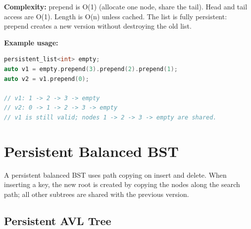 \textbf{Complexity:} prepend is O(1) (allocate one node, share the tail). Head and tail access are O(1). Length is O(n) unless cached. The list is fully persistent: prepend creates a new version without destroying the old list.

\textbf{Example usage:}
\begin{lstlisting}[language=C++]
persistent_list<int> empty;
auto v1 = empty.prepend(3).prepend(2).prepend(1);
auto v2 = v1.prepend(0);

// v1: 1 -> 2 -> 3 -> empty
// v2: 0 -> 1 -> 2 -> 3 -> empty
// v1 is still valid; nodes 1 -> 2 -> 3 -> empty are shared.
\end{lstlisting}

\section{Persistent Balanced BST}\label{sec21:persistent-bst}

A persistent balanced BST uses path copying on insert and delete. When inserting a key, the new root is created by copying the nodes along the search path; all other subtrees are shared with the previous version.

\subsection{Persistent AVL Tree}

